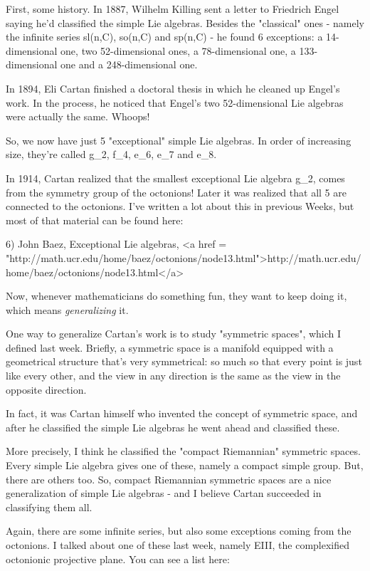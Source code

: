 First, some history.  In 1887, Wilhelm Killing sent a letter to 
Friedrich Engel saying he'd classified the simple Lie algebras.  
Besides the "classical" ones - namely the infinite series sl(n,C), 
so(n,C) and sp(n,C) - he found 6 exceptions: a 14-dimensional one, 
two 52-dimensional ones, a 78-dimensional one, a 133-dimensional 
one and a 248-dimensional one.  

In 1894, Eli Cartan finished a doctoral thesis in which he cleaned 
up Engel's work.   In the process, he noticed that Engel's two 
52-dimensional Lie algebras were actually the same.  Whoops!  

So, we now have just 5 "exceptional" simple Lie algebras.  In 
order of increasing size, they're called g_{2}, 
f_{4}, e_{6}, e_{7} and e_{8}.

In 1914, Cartan realized that the smallest exceptional Lie algebra
g_{2}, comes from the symmetry group of the octonions!  Later
it was realized that all 5 are connected to the octonions.  I've
written a lot about this in previous Weeks, but most of that material
can be found here:

6) John Baez, Exceptional Lie algebras, 
<a href = "http://math.ucr.edu/home/baez/octonions/node13.html">http://math.ucr.edu/home/baez/octonions/node13.html</a>

Now, whenever mathematicians do something fun, they want to keep 
doing it, which means \emph{generalizing} it.  

One way to generalize Cartan's work is to study "symmetric
spaces", which I defined last week.  Briefly, a symmetric space
is a manifold equipped with a geometrical structure that's very
symmetrical: so much so that every point is just like every other, and
the view in any direction is the same as the view in the opposite
direction.

In fact, it was Cartan himself who invented the concept of 
symmetric space, and after he classified the simple Lie algebras 
he went ahead and classified these.   

More precisely, I think he classified the "compact Riemannian" 
symmetric spaces.  Every simple Lie algebra gives one of these, 
namely a compact simple group.  But, there are others too.  So, 
compact Riemannian symmetric spaces are a nice generalization 
of simple Lie algebras - and I believe Cartan succeeded in 
classifying them all.  

Again, there are some infinite series, but also some exceptions 
coming from the octonions.  I talked about one of these last week, 
namely EIII, the complexified octonionic projective plane.  You 
can see a list here:

